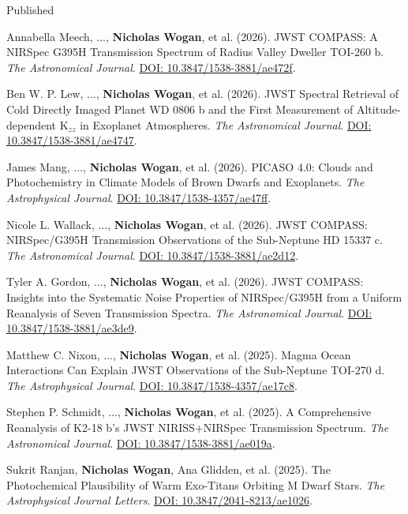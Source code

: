 \documentclass[12pt]{article}
\begin{document}
\noindent Published

\begin{cvlist}
\item[2026]
  Annabella Meech, ..., \textbf{Nicholas Wogan}, et al. (2026). JWST COMPASS: A NIRSpec G395H Transmission Spectrum of Radius Valley Dweller TOI-260 b. \emph{The Astronomical Journal}. \href{https://doi.org/10.3847/1538-3881/ae472f}{DOI: 10.3847/1538-3881/ae472f}.
\item[2026]
  Ben W. P. Lew, ..., \textbf{Nicholas Wogan}, et al. (2026). JWST Spectral Retrieval of Cold Directly Imaged Planet WD 0806 b and the First Measurement of Altitude-dependent K$_{zz}$ in Exoplanet Atmospheres. \emph{The Astronomical Journal}. \href{https://doi.org/10.3847/1538-3881/ae4747}{DOI: 10.3847/1538-3881/ae4747}.
\item[2026]
  James Mang, ..., \textbf{Nicholas Wogan}, et al. (2026). PICASO 4.0: Clouds and Photochemistry in Climate Models of Brown Dwarfs and Exoplanets. \emph{The Astrophysical Journal}. \href{https://doi.org/10.3847/1538-4357/ae47ff}{DOI: 10.3847/1538-4357/ae47ff}.
\item[2026]
  Nicole L. Wallack, ..., \textbf{Nicholas Wogan}, et al. (2026). JWST COMPASS: NIRSpec/G395H Transmission Observations of the Sub-Neptune HD 15337 c. \emph{The Astronomical Journal}. \href{https://doi.org/10.3847/1538-3881/ae2d12}{DOI: 10.3847/1538-3881/ae2d12}.
\item[2026]
  Tyler A. Gordon, ..., \textbf{Nicholas Wogan}, et al. (2026). JWST COMPASS: Insights into the Systematic Noise Properties of NIRSpec/G395H from a Uniform Reanalysis of Seven Transmission Spectra. \emph{The Astronomical Journal}. \href{https://doi.org/10.3847/1538-3881/ae3de9}{DOI: 10.3847/1538-3881/ae3de9}.
\item[2025]
  Matthew C. Nixon, ..., \textbf{Nicholas Wogan}, et al. (2025). Magma Ocean Interactions Can Explain JWST Observations of the Sub-Neptune TOI-270 d. \emph{The Astrophysical Journal}. \href{https://doi.org/10.3847/1538-4357/ae17c8}{DOI: 10.3847/1538-4357/ae17c8}.
\item[2025]
  Stephen P. Schmidt, ..., \textbf{Nicholas Wogan}, et al. (2025). A Comprehensive Reanalysis of K2-18 b's JWST NIRISS+NIRSpec Transmission Spectrum. \emph{The Astronomical Journal}. \href{https://doi.org/10.3847/1538-3881/ae019a}{DOI: 10.3847/1538-3881/ae019a}.
\item[2025]
  Sukrit Ranjan, \textbf{Nicholas Wogan}, Ana Glidden, et al. (2025). The Photochemical Plausibility of Warm Exo-Titans Orbiting M Dwarf Stars. \emph{The Astrophysical Journal Letters}. \href{https://doi.org/10.3847/2041-8213/ae1026}{DOI: 10.3847/2041-8213/ae1026}.

\end{cvlist}
\end{document}
